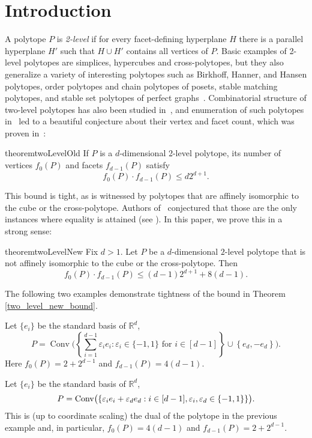 \section{Introduction}

A polytope $P$ is {\it 2-level} if for every facet-defining hyperplane $H$ there is a parallel hyperplane $H'$ such that $H \cup H'$ contains all vertices of $P$. Basic examples of 2-level polytopes are simplices, hypercubes and cross-polytopes, but they also generalize a variety of interesting polytopes such as Birkhoff, Hanner, and Hansen polytopes, order polytopes and chain polytopes of posets, stable matching polytopes, and stable set polytopes of perfect graphs~\cite{aprile18}. Combinatorial structure of two-level polytopes has also been studied in~\cite{fiorini16}, and enumeration of such polytopes in~\cite{bohn18} led to a beautiful conjecture about their vertex and facet count, which was proven in~\cite{kupavskii22}:
\begin{restatable}{theorem}{twoLevelOld}
    \label{two_level_old_bound}
    If $P$ is a $d$-dimensional 2-level polytope, its number of vertices $f_0(P)$ and facets $f_{d-1}(P)$ satisfy
    \[
        f_0(P) \cdot f_{d-1}(P) \leq d 2^{d+1}.
    \]
\end{restatable}
\noindent This bound is tight, as is witnessed by polytopes that are affinely isomorphic to the cube or the cross-polytope. Authors of~\cite{bohn18} conjectured that those are the only instances where equality is attained (see \cite{aprile18}). In this paper, we prove this in a strong sense:

\begin{restatable}{theorem}{twoLevelNew}
    \label{two_level_new_bound}
    Fix $d>1$. Let $P$ be a $d$-dimensional $2$-level polytope that is not affinely isomorphic to the cube or the cross-polytope. Then 
    \[
        f_0(P) \cdot f_{d-1}(P) \leq \left(d-1\right) 2^{d+1} + 8\left(d-1\right).
    \]
\end{restatable}
 \noindent The following two examples demonstrate tightness of the bound in Theorem \ref{two_level_new_bound}.
\begin{example}\label{CubeSuspension}
    Let $\{e_i\}$ be the standard basis of $\mathbb{R}^d$,
    \begin{equation*}
        P=\operatorname{Conv}\Biggl(\left\{\sum_{i=1}^{d-1}\varepsilon_i e_i: \varepsilon_i\in\{-1, 1\} \text{ for }i\in [d-1]\right\}\cup\left\{e_d, -e_d\right\}\Biggr).
    \end{equation*}
 Here $f_0(P) = 2 + 2^{d-1}$ and $f_{d-1}(P) = 4(d-1)$.
\end{example}
\begin{example}\label{OctahedronCrossSegment}
    Let $\{e_i\}$ be the standard basis of $\mathbb{R}^d$,
    \begin{equation*}
        P=\operatorname{Conv}\bigl(\left\{ {\varepsilon}_i e_i+{\varepsilon}_d e_d: i\in [d-1], {\varepsilon}_i,{\varepsilon}_d\in \{-1,1\}\right\}\bigr).
    \end{equation*}
      This is (up to coordinate scaling) the dual of the polytope in the previous example and, in particular,  $f_0(P) = 4(d-1)$ and $f_{d-1}(P) = 2 + 2^{d-1}$. 
\end{example}


